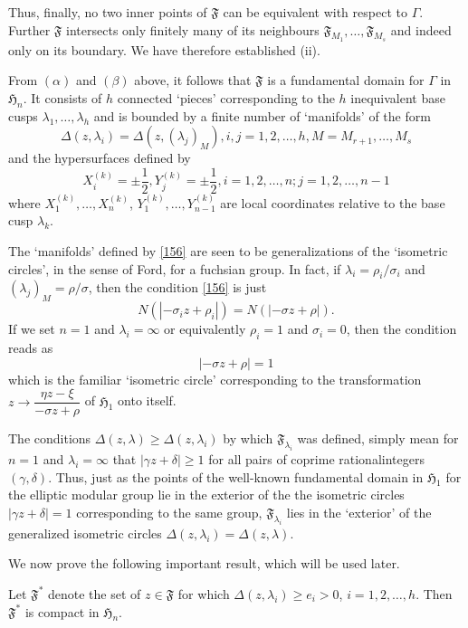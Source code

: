 Thus, finally, no two inner points of $\mathfrak{F}$ can be equivalent
with respect to $\Gamma$. Further $\mathfrak{F}$ intersects only
finitely many of its neighbours
$\mathfrak{F}_{M_{1}},\ldots,\mathfrak{F}_{M_{s}}$ and indeed only on
its boundary. We have therefore established (ii).

From $(\alpha)$ and $(\beta)$ above, it follows that $\mathfrak{F}$ is
a fundamental domain for $\Gamma$ in $\mathfrak{H}_{n}$. It consists
of $h$ connected `pieces' corresponding to the $h$ inequivalent base
cusps $\lambda_{1},\ldots,\lambda_{h}$ and is bounded by a finite
number of `manifolds' of the form
\begin{equation*}
\Delta(z,\lambda_{i})=\Delta(z,(\lambda_{j})_{M}),i,j=1,2,\ldots,h,M=M_{r+1},\ldots,M_{s}\tag{156}\label{156} 
\end{equation*}
and the hypersurfaces defined by
$$
X^{(k)}_{i}=\pm \frac{1}{2}, Y^{(k)}_{j}=\pm
\frac{1}{2},i=1,2,\ldots,n; j=1,2,\ldots,n-1
$$
where $X^{(k)}_{1},\ldots,X^{(k)}_{n}$,
$Y^{(k)}_{1},\ldots,Y^{(k)}_{n-1}$ are local coordinates relative to
the base cusp $\lambda_{k}$.

The `manifolds' defined by \eqref{156} are seen to be generalizations
of the `isometric circles', in the sense of Ford, for a fuchsian
group. In fact, if $\lambda_{i}=\rho_{i}/\sigma_{i}$ and
$(\lambda_{j})_{M}=\rho/\sigma$, then the condition \eqref{156} is
just
$$
N(|-\sigma_{i}z+\rho_{i}|)=N(|-\sigma z+\rho|).
$$
If we set $n=1$ and $\lambda_{i}=\infty$ or equivalently $\rho_{i}=1$
and $\sigma_{i}=0$, then the condition reads as
$$
|-\sigma z+\rho|=1
$$
which is the familiar `isometric circle' corresponding to the
transformation $z\to \dfrac{\eta z-\xi}{-\sigma z+\rho}$ of
$\mathfrak{H}_{1}$ onto itself.

The conditions $\Delta(z,\lambda)\geq \Delta(z,\lambda_{i})$ by which
$\mathfrak{F}_{\lambda_{i}}$ was defined, simply mean for $n=1$ and
$\lambda_{i}=\infty$ that $|\gamma z+\delta|\geq 1$ for all pairs of
coprime rational\pageoriginale integers $(\gamma,\delta)$. Thus, just
as the points of the well-known fundamental domain in
$\mathfrak{H}_{1}$ for the elliptic modular group lie in the exterior
of the the isometric circles $|\gamma z+\delta|=1$ corresponding to
the same group, $\mathfrak{F}_{\lambda_{i}}$ lies in the `exterior' of
the generalized isometric circles
$\Delta(z,\lambda_{i})=\Delta(z,\lambda)$.

We now prove the following important result, which will be used later.

\begin{proposition}\label{prop22}
Let $\mathfrak{F}^{\ast}$ denote the set of $z\in\mathfrak{F}$ for
which $\Delta(z,\lambda_{i})\geq e_{i}>0$, $i=1,2,\ldots,h$. Then
$\mathfrak{F}^{\ast}$ is compact in $\mathfrak{H}_{n}$.
\end{proposition}


